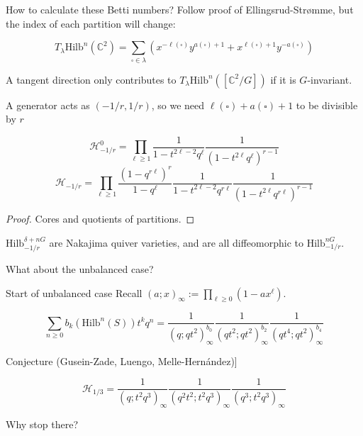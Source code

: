 \documentclass{beamer}
\newcommand{\Hilb}{\textrm{Hilb}}
\newcommand{\C}{\mathbb{C}}
\newcommand{\Z}{\mathbb{Z}}
\begin{document}
\begin{frame}{How to calculate these Betti numbers?}
Follow proof of Ellingsrud-Str\o mme, but the index of each partition will change:

\begin{Lemma}
$$T_\lambda \Hilb^n(\C^2)=\sum_{\square\in\lambda} \left(x^{-\ell(\square)} y^{a(\square)+1}+x^{\ell(\square)+1}y^{-a(\square)}\right)$$
\end{Lemma}

A tangent direction only contributes to $T_\lambda \Hilb^n([\C^2/G])$ if it is $G$-invariant.  
\begin{example}[Balanced $\Z_r$ action]
A generator acts as $(-1/r,1/r)$, so we need $\ell(\square)+a(\square)+1$ to be divisible by $r$
\end{example}

\end{frame}

\begin{frame}
\begin{Theorem}
$$\mathcal{H}^0_{-1/r}=\prod_{\ell\geq 1}\frac{1}{1-t^{2\ell-2}q^\ell}\frac{1}{(1-t^{2\ell}q^\ell)^{r-1}}$$
$$\mathcal{H}_{-1/r}=\prod_{\ell\geq 1} \frac{(1-q^{r\ell})^r}{1-q^\ell}\frac{1}{1-t^{2\ell-2}q^{r\ell}}\frac{1}{(1-t^{2\ell}q^{r\ell})^{r-1}}$$
\end{Theorem}
\begin{proof}
Cores and quotients of partitions.
\end{proof}
 $\Hilb^{\delta+nG}_{-1/r}$ are Nakajima quiver varieties, and are all diffeomorphic to $\Hilb^{nG}_{-1/r}$.
\begin{block}{What about the unbalanced case?}\end{block}
\end{frame}

\begin{frame}{Start of unbalanced case}
Recall $(a;x)_\infty:=\prod_{\ell\geq 0} (1-ax^\ell)$.
\begin{example}[G\"ottsche]
$$\sum_{n\geq 0} b_k(\Hilb^n(S))t^kq^n=
\frac{1}{(q;qt^2)_\infty^{b_0}}\frac{1}{(qt^2;qt^2)_\infty^{b_2}}\frac{1}{(qt^4;qt^2)_\infty^{b_4}}$$
\end{example}
\begin{block}{Conjecture (Gusein-Zade, Luengo, Melle-Hern\'andez)]}

$$\mathcal{H}_{1/3}=\frac{1}{(q;t^2q^3)_\infty}\frac{1}{(q^2t^2;t^2q^3)_\infty}\frac{1}{(q^3;t^2q^3)_\infty}$$
\end{block}
\begin{block}{Why stop there?} 
\end{block}
\end{frame}
\end{document}
